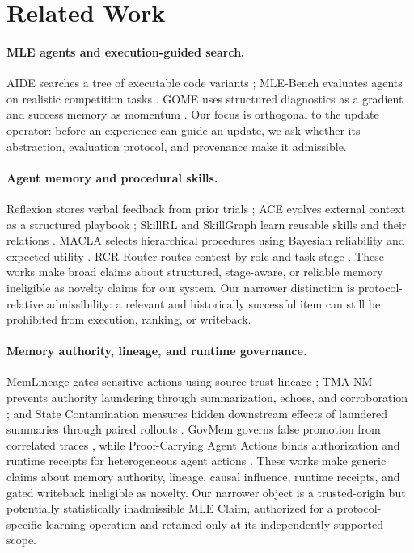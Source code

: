 \documentclass{article}
\begin{document}
\section{Related Work}

\paragraph{MLE agents and execution-guided search.}
AIDE searches a tree of executable code variants \citep{jiang2025aide};
MLE-Bench evaluates agents on realistic competition tasks
\citep{chan2024mlebench}.  GOME uses structured diagnostics as a gradient and
success memory as momentum \citep{zhang2026gome}.  Our focus is orthogonal to
the update operator: before an experience can guide an update, we ask whether
its abstraction, evaluation protocol, and provenance make it admissible.

\paragraph{Agent memory and procedural skills.}
Reflexion stores verbal feedback from prior trials \citep{shinn2023reflexion};
ACE evolves external context as a structured playbook
\citep{zhang2026ace}; SkillRL and SkillGraph learn reusable skills and their
relations \citep{xia2026skillrl,li2026skillgraph}.  MACLA selects hierarchical
procedures using Bayesian reliability and expected utility
\citep{forouzandeh2025macla}.  RCR-Router routes context by role and task stage
\citep{liu2025rcr}.  These works make broad claims about structured,
stage-aware, or reliable memory ineligible as novelty claims for our system.
Our narrower distinction is protocol-relative admissibility: a relevant and
historically successful item can still be prohibited from execution, ranking,
or writeback.

\paragraph{Memory authority, lineage, and runtime governance.}
MemLineage gates sensitive actions using source-trust lineage
\citep{ouyang2026memlineage}; TMA-NM prevents authority laundering through
summarization, echoes, and corroboration \citep{louck2026tmanm}; and State
Contamination measures hidden downstream effects of laundered summaries through
paired rollouts \citep{wang2026statecontamination}.  GovMem governs false
promotion from correlated traces \citep{qi2026govmem}, while Proof-Carrying
Agent Actions binds authorization and runtime receipts for heterogeneous agent
actions \citep{wang2026pcaa}.  These works make generic claims about memory
authority, lineage, causal influence, runtime receipts, and gated writeback
ineligible as novelty.  Our narrower object is a trusted-origin but potentially
statistically inadmissible MLE Claim, authorized for a protocol-specific
learning operation and retained only at its independently supported scope.
\end{document}
